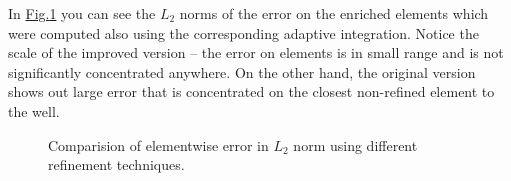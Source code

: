 \documentclass[preprint,12pt,authoryear]{elsarticle}
\newcommand{\fig}[1]{\hyperref[#1]{Fig.\ref{#1}}}
\begin{document}
In \fig{fig:adapt_refinement_norm} you can see the $L_2$ norms of the error on the enriched elements which 
were computed also using the corresponding adaptive integration. Notice the scale of the improved version -- 
the error on elements is in small range and is not significantly concentrated anywhere. On the other hand, 
the original version shows out large error that is concentrated on the closest non-refined element to the well.


\begin{figure}[!htb]
  \centering    
  \hspace{0pt}
  \caption[Adaptive refinement comparision]
  {Comparision of elementwise error in $L_2$ norm using different refinement techniques.
  }
  \label{fig:adapt_refinement_norm}
\end{figure}
\end{document}

